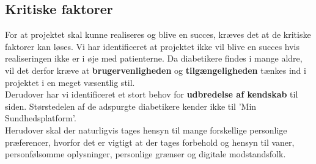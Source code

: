 \subsection{Kritiske faktorer}
For at projektet skal kunne realiseres og blive en succes, kræves det at de kritiske faktorer kan løses. Vi har identificeret at projektet ikke vil blive en succes hvis realiseringen ikke er i øje med patienterne. Da diabetikere findes i mange aldre, vil det derfor kræve at \textbf{brugervenligheden} og \textbf{tilgængeligheden} tænkes ind i projektet i en meget væsentlig stil.\\
Derudover har vi identificeret et stort behov for \textbf{udbredelse af kendskab} til siden. Størstedelen af de adspurgte diabetikere kender ikke til 'Min Sundhedsplatform'.\\
Herudover skal der naturligvis tages hensyn til mange forskellige personlige præferencer, hvorfor det er vigtigt at der tages forbehold og hensyn til vaner, personfølsomme oplysninger, personlige grænser og digitale modstandsfolk.\\
